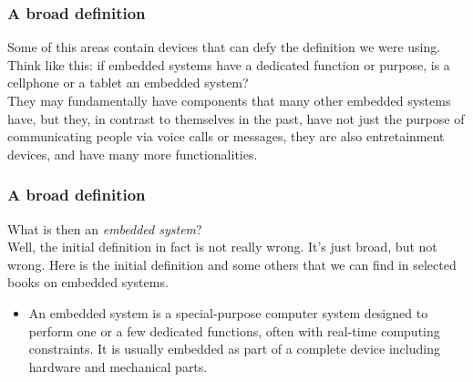 \documentclass[aspectratio=169]{beamer}
\begin{document}
\begin{frame}
  \frametitle{A broad definition}
  Some of this areas contain devices that can defy the definition we were using.\\[5mm] \pause
  Think like this: if embedded systems have a dedicated function or purpose, is a cellphone or a tablet an embedded system?\\[5mm] \pause
  They may fundamentally have components that many other embedded systems have, but they, in contrast to themselves in the past, have not just the purpose of communicating people via voice calls or messages, they are also entretainment devices, and have many more functionalities.
\end{frame}

\begin{frame}
  \frametitle{A broad definition}
  What is then an \textit{embedded system}?\\[5mm] \pause
  Well, the initial definition in fact is not really wrong. It's just broad, but not wrong. Here is the initial definition and some others that we can find in selected books on embedded systems.
  \begin{itemize}
    \item An embedded system is a special-purpose computer system designed to perform one or a few dedicated functions, often with real-time computing constraints. It is usually embedded as part of a complete device including hardware and mechanical parts.
  \end{itemize}
\end{frame}
\end{document}
